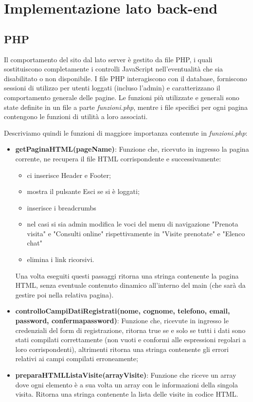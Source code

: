 \section{Implementazione lato back-end}

\subsection{PHP}
Il comportamento del sito dal lato server è gestito da file PHP, i quali sostituiscono completamente i controlli JavaScript nell'eventualità che sia disabilitato o non disponibile. I file PHP interagiscono con il database, forniscono sessioni di utilizzo per utenti loggati (incluso l'admin) e caratterizzano il comportamento generale delle pagine. Le funzioni più utilizzate e generali sono state definite in un file a parte \textit{funzioni.php}, mentre i file specifici per ogni pagina contengono le funzioni di utilità a loro associati. 

Descriviamo quindi le funzioni di maggiore importanza contenute in \textit{funzioni.php}:
\begin{itemize}
\item \textbf{getPaginaHTML(pageName)}: Funzione che, ricevuto in ingresso la pagina corrente, ne recupera il file HTML corrispondente e successivamente:
\begin{itemize}
\item ci inserisce Header e Footer;
\item mostra il pulsante Esci se si è loggati;
\item inserisce i breadcrumbs
\item nel casi si sia admin modifica le voci del menu di navigazione "Prenota visita" e "Consulti online" rispettivamente in "Visite prenotate" e "Elenco chat"
\item elimina i link ricorsivi.
\end{itemize}
Una volta eseguiti questi passaggi ritorna una stringa contenente la pagina HTML, senza eventuale contenuto dinamico all'interno del main (che sarà da gestire poi nella relativa pagina).
\item \textbf{controlloCampiDatiRegistrati(nome, cognome, telefono, email, password, confermapassword)}: Funzione che, ricevute in ingresso le credenziali del form di registrazione, ritorna true se e solo se tutti i dati sono stati compilati correttamente (non vuoti e conformi alle espressioni regolari a loro corrispondenti), altrimenti ritorna una stringa contenente gli errori relativi ai campi compilati erroneamente;
\item \textbf{preparaHTMLListaVisite(arrayVisite)}: Funzione che riceve un array dove ogni elemento è a sua volta un array con le informazioni della singola visita. Ritorna una stringa contenente la lista delle visite in codice HTML.\\
\end{itemize}



